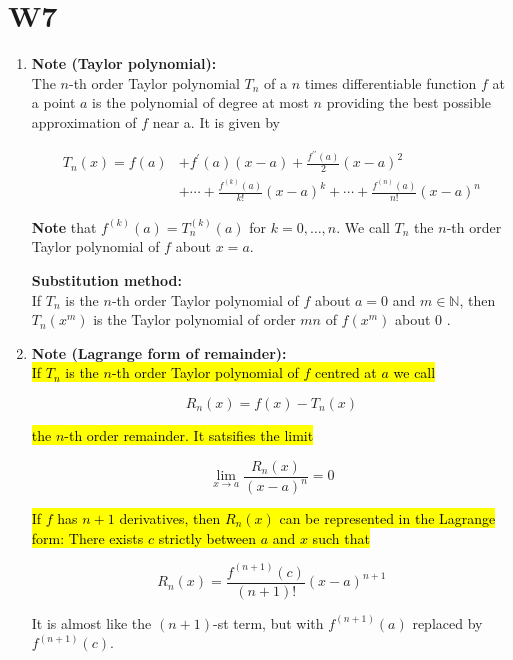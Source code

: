\documentclass[10pt]{article}
\begin{document}
\newpage


\section{W7}

\begin{enumerate}

\item \textbf{Note (Taylor polynomial):}\\
The $n$-th order Taylor polynomial $T_{n}$ of a $n$ times differentiable function $f$ at a point $a$ is the polynomial of degree at most $n$ providing the best possible approximation of $f$ near a. It is given by

$$
\begin{aligned}
T_{n}(x)=f(a) & +f^{\prime}(a)(x-a)+\frac{f^{\prime \prime}(a)}{2}(x-a)^{2} \\
& +\cdots+\frac{f^{(k)}(a)}{k !}(x-a)^{k}+\cdots+\frac{f^{(n)}(a)}{n !}(x-a)^{n}
\end{aligned}
$$

\textbf{Note} that $f^{(k)}(a)=T_{n}^{(k)}(a)$ for $k=0, \ldots, n$. We call $T_{n}$ the $n$-th order Taylor polynomial of $f$ about $x=a$.


\textbf{Substitution method:}\\
If $T_{n}$ is the $n$-th order Taylor polynomial of $f$ about $a=0$ and $m \in \mathbb{N}$, then $T_{n}\left(x^{m}\right)$ is the Taylor polynomial of order $m n$ of $f\left(x^{m}\right)$ about 0 .

\item \textbf{Note (Lagrange form of remainder):}\\
\hl{If $T_{n}$ is the $n$-th order Taylor polynomial of $f$ centred at $a$ we call}

$$
R_{n}(x)=f(x)-T_{n}(x)
$$

\hl{the $n$-th order remainder. It satsifies the limit}

$$
\lim _{x \rightarrow a} \frac{R_{n}(x)}{(x-a)^{n}}=0
$$

\hl{If $f$ has $n+1$ derivatives, then $R_{n}(x)$ can be represented in the Lagrange form: There exists $c$ strictly between $a$ and $x$ such that}

$$
R_{n}(x)=\frac{f^{(n+1)}(c)}{(n+1) !}(x-a)^{n+1}
$$

It is almost like the $(n+1)$-st term, but with $f^{(n+1)}(a)$ replaced by $f^{(n+1)}(c)$.

\end{enumerate}
\end{document}
